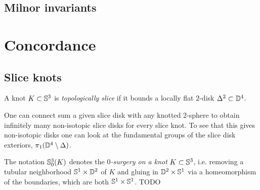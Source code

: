 \subsection{Milnor invariants}


\citep{meilhan2018linking}



\newpage
\section{Concordance}

\subsection{Slice knots}

\begin{definition}
	A knot $K \subset \mathbb{S}^{3}$ is
	\textit{topologically slice} 
	if it bounds a locally flat $2$-disk $\Delta^{2} \subset \mathbb{D}^{4}$.
\end{definition}

\begin{observation}
	One can connect sum a given slice disk with any knotted
	$2$-sphere to obtain infinitely many non-isotopic
	slice disks for every slice knot.
	To see that this gives non-isotopic disks one can look
	at the fundamental groups of the slice disk exteriors,
	$\pi_{1}(\mathbb{D}^{4} \setminus \Delta)$.
\end{observation}


\begin{definition}
	The notation $\mathbb{S}^{3}_{0}(K)$ denotes the \textit{$0$-surgery on a knot}
	$K \subset \mathbb{S}^{3}$, i.e. removing a tubular neighborhood
	$\mathbb{S}^{1} \times \mathbb{D}^{2}$ of $K$ and gluing in $\mathbb{D}^{2} \times \mathbb{S}^{1}$
	via a homeomorphism of the boundaries, which are both $\mathbb{S}^{1} \times \mathbb{S}^{1}$.
	TODO %
\end{definition}

